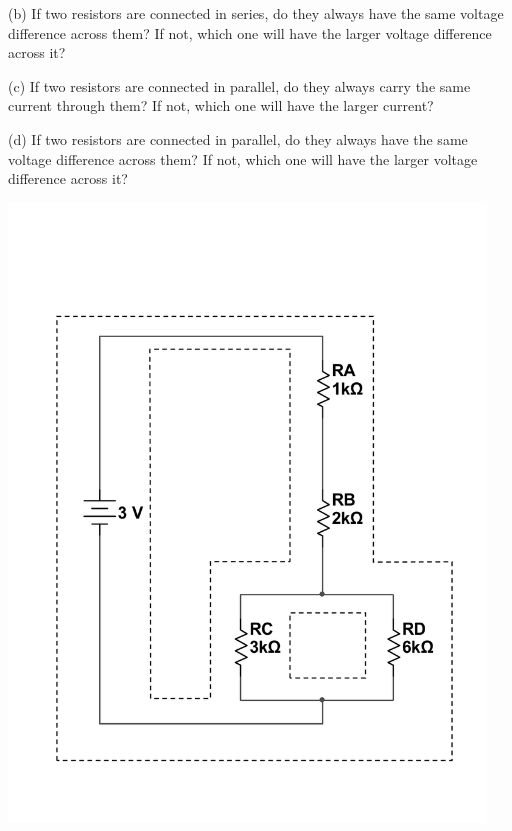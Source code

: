 (b) If two resistors are connected in series, do they always have the same voltage difference across them?  If not, which one will have the larger voltage difference across it?
\vspace {0.7 in}

(c) If two resistors are connected in parallel, do they always carry the same current through them? If not, which one will have the larger current?
\vspace {0.7 in}

(d) If two resistors are connected in parallel, do they always have the same voltage difference across them?  If not, which one will have the larger voltage difference across it?
\vspace {0.7 in}

\cleardoublepage %
\begin{center}
\includegraphics[width=0.95\textwidth]{electric_circuits2/cutout_page_bw.pdf}
\end{center}

\newpage



